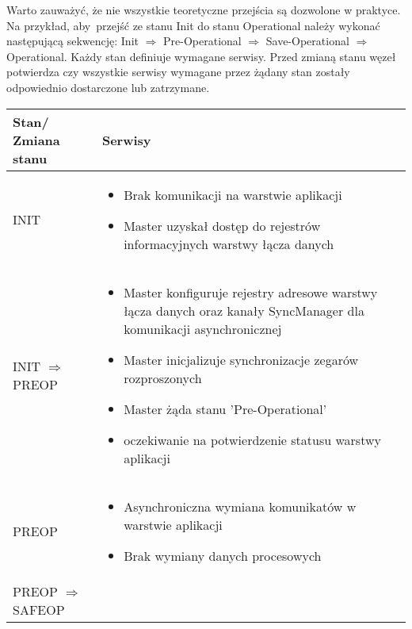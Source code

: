 Warto zauważyć, że nie wszystkie teoretyczne przejścia są dozwolone w praktyce. Na przykład, aby~przejść ze stanu Init do stanu Operational należy wykonać następującą sekwencję: Init $\Rightarrow$ Pre-Operational $\Rightarrow$ Save-Operational $\Rightarrow$ Operational.
Każdy stan definiuje wymagane serwisy. Przed zmianą stanu węzeł potwierdza czy wszystkie serwisy wymagane przez żądany stan zostały odpowiednio dostarczone lub zatrzymane.

\begin{table}[!htb]
\begin{center}
\begin{tabular}{| p{} | p{} |}\hline
\textbf{Stan/ Zmiana stanu} & \textbf{Serwisy}\\\hline\hline
INIT & \begin{itemize} \setlength{\itemsep}{0pt} \setlength{\parskip}{0pt} \setlength{\parsep}{0pt} \setlength{\topsep}{0pt}
\item Brak komunikacji na warstwie aplikacji
\item Master uzyskał dostęp do rejestrów informacyjnych warstwy łącza danych
\end{itemize} \\\hline
INIT $\Rightarrow$ PREOP & \begin{itemize} \setlength{\itemsep}{0pt} \setlength{\parskip}{0pt} \setlength{\parsep}{0pt} \setlength{\topsep}{0pt}
\item Master konfiguruje rejestry adresowe warstwy łącza danych oraz kanały SyncManager dla komunikacji asynchronicznej
\item Master inicjalizuje synchronizacje zegarów rozproszonych
\item Master żąda stanu 'Pre-Operational'
\item oczekiwanie na potwierdzenie statusu warstwy aplikacji
\end{itemize}\\\hline
PREOP & \begin{itemize} \setlength{\itemsep}{0pt} \setlength{\parskip}{0pt} \setlength{\parsep}{0pt} \setlength{\topsep}{0pt}
\item Asynchroniczna wymiana komunikatów w warstwie aplikacji
\item Brak wymiany danych procesowych
\end{itemize}\\\hline
PREOP $\Rightarrow$ SAFEOP & \begin{itemize} \setlength{\itemsep}{0pt} \setlength{\parskip}{0pt} \setlength{\parsep}{0pt} \setlength{\topsep}{0pt}

\end{itemize}
\end{tabular}
\end{center}
\end{table}
